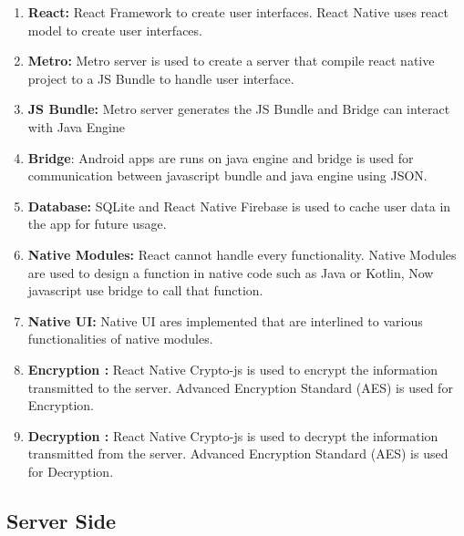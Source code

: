\begin{enumerate}[label=\roman*.]

    \item \textbf{React:} React Framework to create user interfaces.
    React Native uses react model to create user interfaces.
    
    \item \textbf{Metro:} Metro server is used to create a server that compile react native project to a JS Bundle to handle user interface.
    
    \item \textbf{JS Bundle:} Metro server generates the JS Bundle and Bridge can interact with Java Engine

    \item \textbf{Bridge}: Android apps are runs on java engine and  bridge is used for communication between javascript bundle  and java engine  using JSON.
    
    \item \textbf{Database:} SQLite and React Native Firebase is used to cache user data in the app for future usage.
    
    \item \textbf{Native Modules:} React cannot handle every functionality.
    Native Modules are used to  design a function in native code such as Java or Kotlin, Now javascript use bridge to call that function.
    
    \item \textbf{Native UI:} Native UI ares implemented that are interlined to various functionalities of native modules.
    
    \item \textbf{Encryption :} React Native Crypto-js is used to encrypt the information transmitted to the server.
    Advanced Encryption Standard (AES) is used for Encryption.
    
    \item \textbf{Decryption :} React Native Crypto-js is used to decrypt the information transmitted from the server.
    Advanced Encryption Standard (AES) is used for Decryption.

\end{enumerate}

\subsection{Server Side}\label{subsec:server-side}

